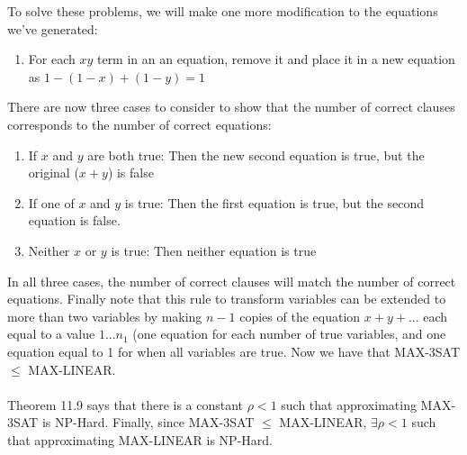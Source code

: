 \documentclass[letterpaper,notitlepage,twoside]{article}
\begin{document}
To solve these problems, we will make one more modification to the equations we've generated:
\begin{enumerate}
\item For each $xy$ term in an an equation, remove it and place it in a new equation as $1 - (1 - x) + (1 - y) = 1$
\end{enumerate}
There are now three cases to consider to show that the number of correct clauses corresponds to the number of correct equations:
\begin{enumerate}
\item If $x$ and $y$ are both true: Then the new second equation is true, but the original ($x + y$) is false
\item If one of $x$ and $y$ is true: Then the first equation is true, but the second equation is false.
\item Neither $x$ or $y$ is true: Then neither equation is true
\end{enumerate}
In all three cases, the number of correct clauses will match the number of correct equations. Finally note that this rule to transform variables can be extended to more than two variables by making $n-1$ copies of the equation $x+y+...$ each equal to a value $1...n_1$ (one equation for each number of true variables, and one equation equal to 1 for when all variables are true. Now we have that MAX-3SAT $\leq$ MAX-LINEAR.
\\\\
Theorem 11.9 says that there is a constant $\rho < 1$ such that approximating MAX-3SAT is NP-Hard. Finally, since MAX-3SAT $\leq$ MAX-LINEAR, $\exists \rho < 1$ such that approximating MAX-LINEAR is NP-Hard.
\end{document}
